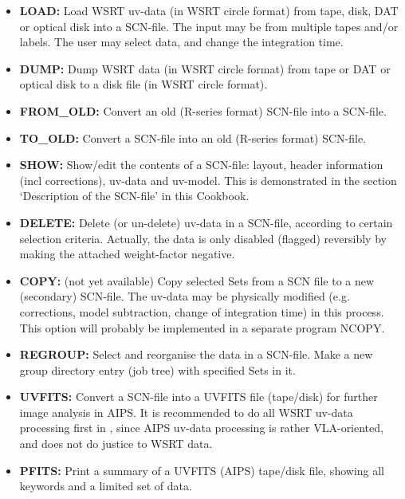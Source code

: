 \begin{itemize} 
\item {\bf LOAD:} 
Load WSRT uv-data (in WSRT circle format) from tape, disk, DAT or optical disk
into a SCN-file. 
The input may be from multiple tapes and/or labels. 
The user may select data, and change the integration time. 

\item {\bf DUMP:} 
Dump WSRT data (in WSRT circle format) from tape or DAT or optical disk to a
disk file (in WSRT circle format). 

\item {\bf FROM\_OLD:} 
Convert an old (R-series format) SCN-file into a \NEWSTAR SCN-file. 

\item {\bf TO\_OLD:} 
Convert a \NEWSTAR SCN-file into an old (R-series format) SCN-file. 

\item {\bf SHOW:} 
Show/edit the contents of a SCN-file: layout, header information 
(incl corrections), uv-data and uv-model. 
This is demonstrated in the section `Description of the SCN-file' in this
Cookbook. 

\item {\bf DELETE:} 
Delete (or un-delete) uv-data in a SCN-file, according to certain selection
criteria. Actually, the data is only disabled (flagged) reversibly by making
the attached weight-factor negative. 

\item {\bf COPY:} (not yet available) 
Copy selected Sets from a SCN file to a new (secondary) SCN-file. The uv-data
may be physically modified (e.g. corrections, model subtraction, change of
integration time) in this process. 
This option will probably be implemented in a separate program NCOPY. 

\item {\bf REGROUP:} 
Select and reorganise the data in a SCN-file. 
Make a new group directory entry (job tree) with specified Sets in it. 

\item {\bf UVFITS:} 
Convert a SCN-file into a UVFITS file (tape/disk) for further image analysis in
AIPS. 
It is recommended to do all WSRT uv-data processing first in \NEWSTAR, since
AIPS uv-data processing is rather VLA-oriented, and does not do justice to WSRT
data. 

\item {\bf PFITS:} 
Print a summary of a UVFITS (AIPS) tape/disk file, showing all keywords and a
limited set of data. 


\end{itemize}
